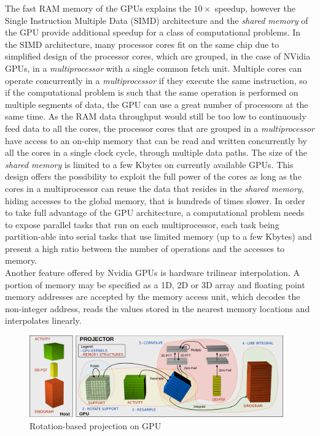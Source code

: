 \documentclass[12pt,a4paper]{report}
\begin{document}
The fast RAM memory of the GPUs explains the $10\times$ speedup, however the Single Instruction Multiple Data (SIMD) architecture and the 
\textit{shared memory} of the GPU provide additional speedup for a class of computational problems. In the SIMD architecture, 
many processor cores fit on the same chip due to simplified design of the processor cores, 
which are grouped, in the case of NVidia GPUs, in a \textit{multiprocessor} with a single common fetch unit. Multiple 
cores can operate concurrently in a \textit{multiprocessor} if they execute the same instruction, so 
if the computational problem is such that the same operation is performed on multiple segments of data, the GPU 
can use a great number of processors at the same time. As the RAM data throughput would still be too low to continuously feed data to all 
the cores, the processor cores that are grouped in a \textit{multiprocessor} have access to an on-chip memory that can be read and written 
concurrently by all the cores in a single clock cycle, through multiple data paths. The size of the \textit{shared memory} is limited to a few 
Kbytes on currently available GPUs. This design offers the possibility to exploit the full power of the cores as long as the cores 
in a multiprocessor can reuse the data that resides in the \textit{shared memory}, hiding accesses to the global memory, that is hundreds of times slower. 
In order to take full advantage of the GPU architecture, a computational problem needs to expose parallel tasks that run on each multiprocessor, 
each task being partition-able into serial tasks that use limited memory (up to a few Kbytes) and present a high ratio 
between the number of operations and the accesses to memory.\\

Another feature offered by Nvidia GPUs is hardware trilinear interpolation. A portion of memory may be specified as a 1D, 2D or 3D array and floating 
point memory addresses are accepted by the memory access unit, which decodes the non-integer address, reads the values stored in the nearest 
memory locations and interpolates linearly. \\

\begin{figure}[h]
\centering
\includegraphics[width=4.3in]{gpu_1}
\caption{Rotation-based projection on GPU}
\label{fig:gpu_projection}
\end{figure}
\end{document}
